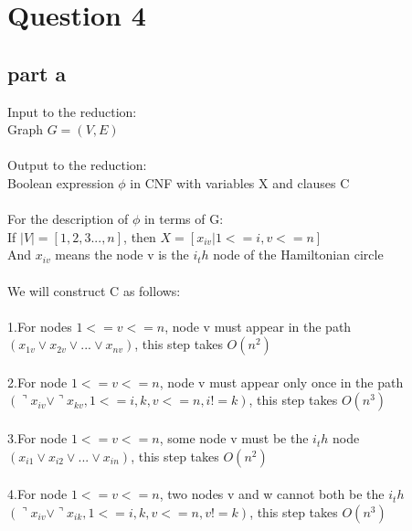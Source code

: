 \documentclass[paper=a4, fontsize=11pt]{scrartcl} %
\numberwithin{equation}{section} %
\numberwithin{figure}{section} %
\numberwithin{table}{section} %
\begin{document}
\vspace{2cm}
\section{\textbf{Question 4}}
\subsection{\textbf{part a}}
Input to the reduction:\\
Graph $G=(V,E)$\\ \\
Output to the reduction:\\
Boolean expression $\phi$ in CNF with variables X and clauses C\\ \\
For the description of $\phi$ in terms of G:\\ 
If $|V|={[1,2,3...,n]}$, then $X={[x_{iv}|1<=i, v<=n]}$\\
And $x_{iv}$ means the node v is the $i_th$ node of the Hamiltonian circle\\ \\
We will construct C as follows:\\ \\
1.For nodes $1<=v<=n$, node v must appear in the path\\
$(x_{1v} \vee x_{2v} \vee ... \vee x_{nv})$, this step takes $O(n^2)$\\ \\

2.For node $1<=v<=n$, node v must appear only once in the path\\
$(\urcorner x_{iv} \vee \urcorner x_{kv}, 1<=i,k,v<=n, i !=k)$, this step takes $O(n^3)$ \\ \\

3.For node $1<=v<=n$, some node v must be the $i_th$ node\\
$(x_{i1} \vee x_{i2} \vee ... \vee x_{in})$, this step takes $O(n^2)$\\ \\

4.For node $1<=v<=n$, two nodes v and w cannot both be the $i_th$\\
$(\urcorner x_{iv} \vee \urcorner x_{ik}, 1<=i,k,v<=n, v!=k)$, this step takes $O(n^3)$ \\ \\
\end{document}
